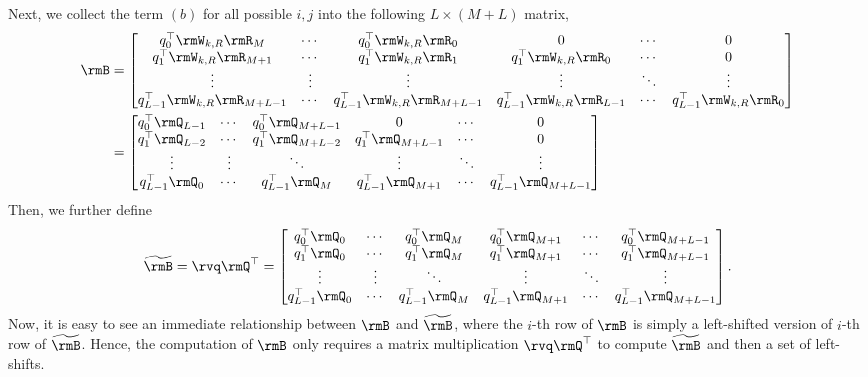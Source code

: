 Next, we collect the term $(b)$ for all possible $i, j$ into the following $L \times (M+L)$ matrix,
\begin{align*}
\rmB &=
	\begin{bmatrix}
	q_0^\top \rmW_{k,R} \rmR_{M}   & \cdots & q_0^\top \rmW_{k,R} \rmR_{0} & 0 & \cdots & 0 \\
	q_1^\top \rmW_{k,R} \rmR_{M+1} & \cdots & q_1^\top \rmW_{k,R} \rmR_{1} & q_1^\top \rmW_{k,R} \rmR_{0} & \cdots & 0 \\
	\vdots & \vdots & \vdots & \vdots & \ddots & \vdots \\
	q_{L-1}^\top \rmW_{k,R} \rmR_{M+L-1} & \cdots & q_{L-1}^\top \rmW_{k,R} \rmR_{M+L-1} & q_{L-1}^\top \rmW_{k,R} \rmR_{L-1} & \cdots & q_{L-1}^\top \rmW_{k,R} \rmR_{0} \\
	\end{bmatrix} \\
	&=
	\begin{bmatrix}
	q_0^\top \rmQ_{L-1}   & \cdots & q_0^\top \rmQ_{M+L-1} & 0                       & \cdots & 0 \\
	q_1^\top \rmQ_{L-2}   & \cdots & q_1^\top \rmQ_{M+L-2} & q_1^\top \rmQ_{M+L-1}   & \cdots & 0 \\
	\vdots                & \vdots & \ddots                & \vdots                  & \ddots & \vdots \\
	q_{L-1}^\top \rmQ_{0} & \cdots & q_{L-1}^\top \rmQ_{M} & q_{L-1}^\top \rmQ_{M+1} & \cdots & q_{L-1}^\top \rmQ_{M+L-1} \\
	\end{bmatrix}
\end{align*}
Then, we further define
\[
	\widetilde{\rmB} = \rvq \rmQ^\top =
	\begin{bmatrix}
	q_{0}^\top \rmQ_{0}   & \cdots & q_{0}^\top \rmQ_{M}   & q_{0}^\top \rmQ_{M+1}    & \cdots & q_{0}^\top \rmQ_{M+L-1}   \\
	q_{1}^\top \rmQ_{0}   & \cdots & q_{1}^\top \rmQ_{M}   & q_{1}^\top \rmQ_{M+1}    & \cdots & q_{1}^\top \rmQ_{M+L-1}   \\
	\vdots                & \vdots & \ddots                & \vdots                   & \ddots & \vdots                    \\
	q_{L-1}^\top \rmQ_{0} & \cdots & q_{L-1}^\top \rmQ_{M} & q_{L-1}^\top \rmQ_{M+1}  & \cdots & q_{L-1}^\top \rmQ_{M+L-1} \\
	\end{bmatrix}.
\]
Now, it is easy to see an immediate relationship between $\rmB$ and $\widetilde{\rmB}$, where the $i$-th row of $\rmB$ is simply a left-shifted version of $i$-th row of $\widetilde{\rmB}$.
Hence, the computation of $\rmB$ only requires a matrix multiplication $\rvq \rmQ^\top$ to compute $\widetilde{\rmB}$ and then a set of left-shifts.

